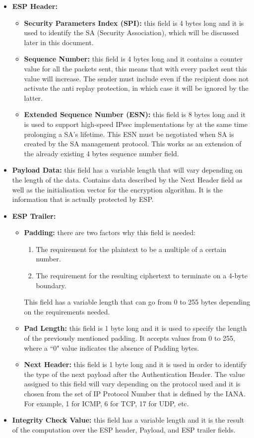 \documentclass[11pt]{book}
\begin{document}
\begin{itemize}
\item \textbf{ESP Header:} 
	\begin{itemize}
	\item \textbf{Security Parameters Index (SPI):} this field is 4 bytes long and it is used to identify the SA (Security Association), which will be discussed later in this document. 
	\item \textbf{Sequence Number:} this field is 4 bytes long and it contains a counter value for all the packets sent, this means that with every packet sent this value will increase. The sender must include even if the recipient does not activate the anti replay protection, in which case it will be ignored by the latter.
	\item \textbf{Extended Sequence Number (ESN):} this field is 8 bytes long and it is used to support high-speed IPsec implementations by at the same time prolonging a SA's lifetime. This ESN must be negotiated when SA is created by the SA management protocol. This works as an extension of the already existing 4 bytes sequence number field.
\end{itemize}
\item \textbf{Payload Data:} this field has a variable length that will vary depending on the length of the data. Contains data described by the Next Header field as well as the initialisation vector for the encryption algorithm. It is the information that is actually protected by ESP.
\item \textbf{ESP Trailer:}
	\begin{itemize}
	\item \textbf{Padding:} there are two factors why this field is needed: 
		\begin{enumerate}
		\item The requirement for the plaintext to be a multiple of a certain number.
		\item The requirement for the resulting ciphertext to terminate on a 4-byte boundary.
		\end{enumerate}
	This field has a variable length that can go from 0 to 255 bytes depending on the requirements needed. 
	\item \textbf{Pad Length:} this field is 1 byte long and it is used to specify the length of the previously mentioned padding. It accepts values from 0 to 255, where a ``0" value indicates the absence of Padding bytes.
	\item \textbf{Next Header:} this field is 1 byte long and it is used in order to identify the type of the next payload after the Authentication Header. The value assigned to this field will vary depending on the protocol used and it is chosen from the set of IP Protocol Number that is defined by the IANA. For example, 1 for ICMP, 6 for TCP, 17 for UDP, etc. 
	\end{itemize}
\item \textbf{Integrity Check Value:} this field has a variable length and it is the result of the computation over the ESP header, Payload, and ESP trailer fields.
\end{itemize}
\end{document}
